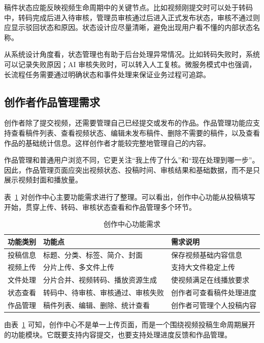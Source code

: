 稿件状态应能反映视频生命周期中的关键节点。比如视频刚提交时可以处于转码中，转码完成后进入待审核，管理员审核通过后进入正式发布状态，审核不通过则应显示驳回状态和原因。状态设计应尽量清晰，避免出现用户看不懂的内部状态名称。

从系统设计角度看，状态管理也有助于后台处理异常情况。比如转码失败时，系统可以记录失败原因；AI 审核失败时，可以转入人工复核。微服务模式中也强调，长流程任务需要通过明确状态和事件处理来保证业务过程可追踪\cite{richardson2018microservices}。

\subsection{创作者作品管理需求}
\label{subsec:creator-work-management}

创作者除了提交视频，还需要管理自己已经提交或发布的作品。作品管理功能应支持查看稿件列表、查看视频状态、编辑未发布稿件、删除不需要的稿件，以及查看作品的基础统计信息。这样创作者才能较完整地管理自己的内容。

作品管理和普通用户浏览不同，它更关注“我上传了什么”和“现在处理到哪一步”。因此，作品管理页面应突出视频状态、投稿时间、审核结果和基础数据，而不是只展示视频封面和播放量。

表~\ref{tab:creator-functions} 对创作中心主要功能需求进行了整理。可以看出，创作中心功能从投稿填写开始，贯穿上传、转码、审核状态查看和作品管理多个环节。

\begin{table}[htbp]
  \centering
  \caption{创作中心功能需求}
  \label{tab:creator-functions}
  \begin{tabular}{p{}p{}p{}}
    \hline
    \textbf{功能类别} & \textbf{功能点} & \textbf{需求说明} \\
    \hline
    投稿信息 & 标题、分类、标签、简介、封面 & 保存视频基础内容信息 \\
    视频上传 & 分片上传、多文件上传 & 支持大文件稳定上传 \\
    文件处理 & 分片合并、视频转码、播放资源生成 & 使视频满足在线播放要求 \\
    状态查看 & 转码中、待审核、审核通过、审核失败 & 创作者可查看稿件处理进度 \\
    作品管理 & 稿件列表、编辑、删除、统计查看 & 创作者可管理个人投稿内容 \\
    \hline
  \end{tabular}
\end{table}

由表~\ref{tab:creator-functions} 可知，创作中心不是单一上传页面，而是一个围绕视频投稿生命周期展开的功能模块。它既要支持内容提交，也要支持处理进度反馈和作品管理。

